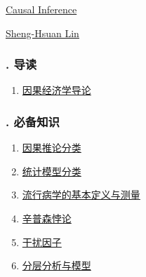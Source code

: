 \documentclass[11pt]{article}
\begin{document}
	\kaishu 
	\setcounter{section}{0}
	\begin{center}
		{\LARGE  \href{https://shenghsuanlin.web.nycu.edu.tw/wp-content/uploads/sites/349/2022/09/Syllabus.pdf}{Causal Inference}}
		
		
		{\large \href{https://shenghsuanlin.web.nycu.edu.tw/}{Sheng-Hsuan Lin}}
	\end{center}
\setcounter{page}{1}



\vspace{-1cm}

\subsubsection*{. 导读}

\vspace{-0.5cm}

\begin{enumerate}
	\item \href{https://mp.weixin.qq.com/s/GRRr4QLAyD6dl-DqSXUppA}{因果经济学导论}	%
\end{enumerate}

\vspace{-1cm}

\subsubsection*{. 必备知识}

\vspace{-0.5cm}

\begin{multicols}{2}
	\begin{enumerate}
		\item \href{https://mp.weixin.qq.com/s/_4459wttNLq4Ug4iPMNuyQ}{因果推论分类}	%
		\item \href{https://mp.weixin.qq.com/s/uNK3o0KsPv4NoVp1vDiZvA}{统计模型分类}	%
		\item \href{https://mp.weixin.qq.com/s/vFPrBpP47TYifWgaqA0QLg}{流行病学的基本定义与测量}	%
		\item \href{https://mp.weixin.qq.com/s/y40XDRGrVoIgcCCYtAn80A}{辛普森悖论}	%
		\item \href{https://mp.weixin.qq.com/s/RTbZ2oePbaL9Lx2UhosjAw}{干扰因子}	%
		\item \href{https://mp.weixin.qq.com/s/s2HTAYpsZt-JRUaMreC-yg}{分层分析与模型}	%
	\end{enumerate}
\end{multicols}
\end{document}
